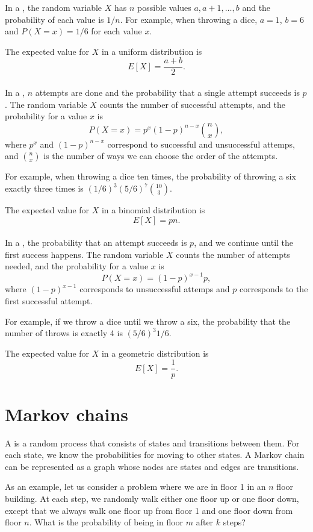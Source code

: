 In a ,
the random variable $X$ has $n$ possible
values $a,a+1,\ldots,b$ and the probability of each value is $1/n$.
For example, when throwing a dice,
$a=1$, $b=6$ and $P(X=x)=1/6$ for each value $x$.

The expected value for $X$ in a uniform distribution is
\[E[X] = \frac{a+b}{2}.\]
~\\
In a , $n$ attempts
are done
and the probability that a single attempt succeeds
is $p$.
The random variable $X$ counts the number of
successful attempts,
and the probability for a value $x$ is
\[P(X=x)=p^x (1-p)^{n-x} {n \choose x},\]
where $p^x$ and $(1-p)^{n-x}$ correspond to
successful and unsuccessful attemps,
and ${n \choose x}$ is the number of ways
we can choose the order of the attempts.

For example, when throwing a dice ten times,
the probability of throwing a six exactly
three times is $(1/6)^3 (5/6)^7 {10 \choose 3}$.

The expected value for $X$ in a binomial distribution is
\[E[X] = pn.\]
~\\
In a ,
the probability that an attempt succeeds is $p$,
and we continue until the first success happens.
The random variable $X$ counts the number
of attempts needed, and the probability for
a value $x$ is
\[P(X=x)=(1-p)^{x-1} p,\]
where $(1-p)^{x-1}$ corresponds to unsuccessful attemps
and $p$ corresponds to the first successful attempt.

For example, if we throw a dice until we throw a six,
the probability that the number of throws
is exactly 4 is $(5/6)^3 1/6$.

The expected value for $X$ in a geometric distribution is
\[E[X]=\frac{1}{p}.\]

\section{Markov chains}


A  is a random process
that consists of states and transitions between them.
For each state, we know the probabilities
for moving to other states.
A Markov chain can be represented as a graph
whose nodes are states and edges are transitions.

As an example, let us consider a problem
where we are in floor 1 in an $n$ floor building.
At each step, we randomly walk either one floor
up or one floor down, except that we always
walk one floor up from floor 1 and one floor down
from floor $n$.
What is the probability of being in floor $m$
after $k$ steps?


